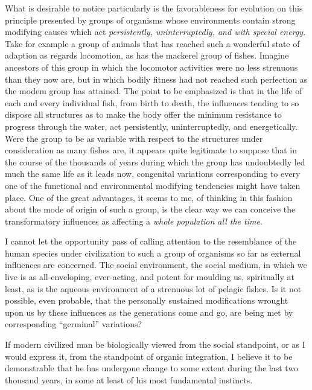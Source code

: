 \documentclass[a4paper, 11pt, oneside, polutonikogreek, english, landscape]{article}
\begin{document}
What is desirable to notice particularly is the favorableness for evolution on this principle presented by groups of organisms whose environments contain strong modifying causes which act \emph{persistently, uninterruptedly, and with special energy}. Take for example a group of animals that has reached such a wonderful state of adaption as regards locomotion, as has the mackerel group of fishes. Imagine ancestors of this group in which the locomotor activities were no less strenuous than they now are, but in which bodily fitness had not reached such perfection as the modem group has attained. The point to be emphasized is that in the life of each and every individual fish, from birth to death, the influences tending to so dispose all structures as to make the body offer the minimum resistance to progress through the water, act persistently, uninterruptedly, and energetically. Were the group to be as variable with respect to the structures under consideration as many fishes are, it appears quite legitimate to suppose that in the course of the thousands of years during which the group has undoubtedly led much the same life as it leads now, congenital variations corresponding to every one of the functional and environmental modifying tendencies might have taken place. One of the great advantages, it seems to me, of thinking in this fashion about the mode of origin of such a group, is the clear way we can conceive the transformatory influences as affecting a \emph{whole population all the time}.

I cannot let the opportunity pass of calling attention to the resemblance of the human species under civilization to such a group of organisms so far as external influences are concerned. The social environment, the social medium, in which we live is as all-enveloping, ever-acting, and potent for moulding us, spiritually at least, as is the aqueous environment of a strenuous lot of pelagic fishes. Is it not possible, even probable, that the personally sustained modifications wrought upon us by these influences as the generations come and go, are being met by corresponding ``germinal'' variations?

If modern civilized man be biologically viewed from the social standpoint, or as I would express it, from the standpoint of organic integration, I believe it to be demonstrable that he has undergone change to some extent during the last two thousand years, in some at least of his most fundamental instincts.
\end{document}
